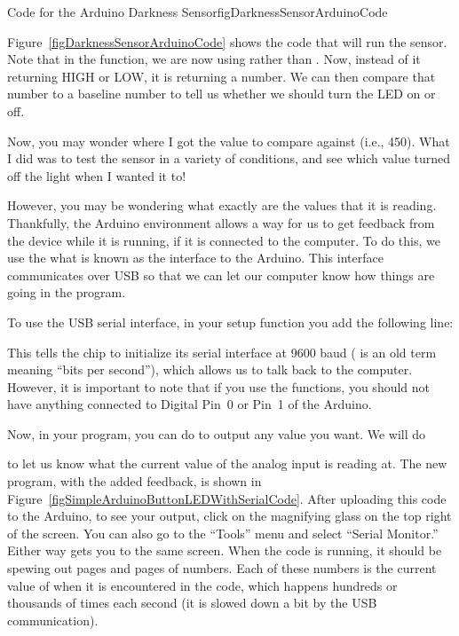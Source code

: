 \begin{typingwithlabel}{Code for the Arduino Darkness Sensor}{figDarknessSensorArduinoCode}

\end{typingwithlabel}

Figure~\ref{figDarknessSensorArduinoCode} shows the code that will run the sensor.
Note that in the  function, we are now using  rather than . 
Now, instead of it returning HIGH or LOW, it is returning a number.
We can then compare that number to a baseline number to tell us whether we should turn the LED on or off.

Now, you may wonder where I got the value to compare against (i.e., 450). 
What I did was to test the sensor in a variety of conditions, and see which value turned off the light when I wanted it to!

However, you may be wondering what exactly are the values that it is reading.
Thankfully, the Arduino environment allows a way for us to get feedback from the device while it is running, if it is connected to the computer.
To do this, we use the what is known as the  interface to the Arduino.
This interface communicates over USB so that we can let our computer know how things are going in the program.

To use the USB serial interface, in your setup function you add the following line:


This tells the chip to initialize its serial interface at 9600 baud ( is an old term meaning ``bits per second''), which allows us to talk back to the computer.
However, it is important to note that if you use the  functions, you should not have anything connected to Digital Pin~0 or Pin~1 of the Arduino.

Now, in your program, you can do  to output any value you want.
We will do


to let us know what the current value of the analog input is reading at.
The new program, with the added feedback, is shown in Figure~\ref{figSimpleArduinoButtonLEDWithSerialCode}.
After uploading this code to the Arduino, to see your output, click on the magnifying glass on the top right of the screen.  
You can also go to the ``Tools'' menu and select ``Serial Monitor.''
Either way gets you to the same screen.
When the code is running, it should be spewing out pages and pages of numbers.
Each of these numbers is the current value of  when it is encountered in the code, which happens hundreds or thousands of times each second (it is slowed down a bit by the USB communication).

